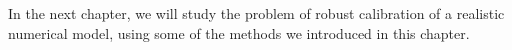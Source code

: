 \documentclass[../../Main_ManuscritThese.tex]{subfiles}
\begin{document}
In the next chapter, we will study the problem of robust calibration
of a realistic numerical model, using some of the methods we
introduced in this chapter.


\markchapterend

\subfileLocal{
	\pagestyle{empty}
	
	
}
\end{document}
